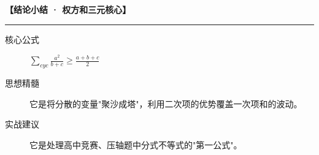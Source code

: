 \begin{summarybox}
\textbf{【结论小结 · 权方和三元核心】}
\vspace{0.8em}
\hrule
\vspace{0.8em}

\begin{description}
    \item[核心公式] $\sum_{cyc} \frac{a^2}{b+c} \geqslant \frac{a+b+c}{2}$
    \item[思想精髓] 它是将分散的变量"聚沙成塔"，利用二次项的优势覆盖一次项和的波动。
    \item[实战建议] 它是处理高中竞赛、压轴题中分式不等式的"第一公式"。
\end{description}
\end{summarybox}